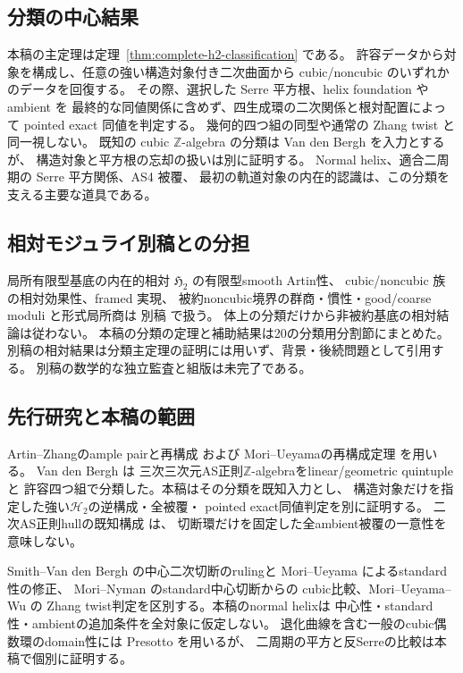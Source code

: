 \documentclass[a4paper,11pt]{ltjsarticle}
\numberwithin{equation}{section}
\theoremstyle{plain}
\theoremstyle{definition}
\theoremstyle{remark}
\newcommand{\HH}{\mathcal H_2}
\begin{document}
\subsection{分類の中心結果}
\label{sec:intro-classification}

本稿の主定理は定理~\ref{thm:complete-h2-classification} である。
許容データから対象を構成し、任意の強い構造対象付き二次曲面から
cubic/noncubic のいずれかのデータを回復する。
その際、選択した Serre 平方根、helix foundation や ambient を
最終的な同値関係に含めず、四生成環の二次関係と根対配置によって
pointed exact 同値を判定する。
幾何的四つ組の同型や通常の Zhang twist と同一視しない。
既知の cubic $\mathbb Z$-algebra の分類は
Van den Bergh \cite{VdB2011} を入力とするが、
構造対象と平方根の忘却の扱いは別に証明する。
Normal helix、適合二周期の Serre 平方関係、AS4 被覆、
最初の軌道対象の内在的認識は、この分類を支える主要な道具である。

\subsection{相対モジュライ別稿との分担}

局所有限型基底の内在的相対 $\mathfrak H_2$ の有限型smooth Artin性、
cubic/noncubic 族の相対効果性、framed 実現、
被約noncubic境界の群商・慣性・good/coarse moduli と形式局所商は
別稿 \cite{QuadricModuli2026} で扱う。
体上の分類だけから非被約基底の相対結論は従わない。
本稿の分類の定理と補助結果は20の分類用分割節にまとめた。
別稿の相対結果は分類主定理の証明には用いず、背景・後続問題として引用する。
別稿の数学的な独立監査と組版は未完了である。

\subsection{先行研究と本稿の範囲}

Artin--Zhangのample pairと再構成 \cite{AZ1994} および
Mori--Ueyamaの再構成定理 \cite[Definition 2.5, Theorem 2.6]{MU2021} を用いる。
Van den Bergh \cite[arXiv v3, Theorem 5.5.10]{VdB2011} は
三次三次元AS正則$\mathbb Z$-algebraをlinear/geometric quintupleと
許容四つ組で分類した。本稿はその分類を既知入力とし、
構造対象だけを指定した強い$\HH$の逆構成・全被覆・
pointed exact同値判定を別に証明する。
二次AS正則hullの既知構成
\cite[arXiv v3, Theorem 6.1]{VdB2011} は、
切断環だけを固定した全ambient被覆の一意性を意味しない。

Smith--Van den Bergh \cite{SVdB2013} の中心二次切断のrulingと
Mori--Ueyama \cite{MU2021} によるstandard性の修正、
Mori--Nyman \cite[Theorem 6.13]{MN2025} のstandard中心切断からの
cubic比較、Mori--Ueyama--Wu \cite{MUW2026} の
Zhang twist判定を区別する。本稿のnormal helixは
中心性・standard性・ambientの追加条件を全対象に仮定しない。
退化曲線を含む一般のcubic偶数環のdomain性には
Presotto \cite[Theorem 2.8; Appendix A]{Presotto2018} を用いるが、
二周期の平方と反Serreの比較は本稿で個別に証明する。
\end{document}
